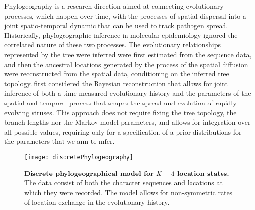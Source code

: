 Phylogeography is a research direction aimed at connecting evolutionary processes, which happen over time, with the processes of spatial dispersal into a joint spatio-temporal dynamic that can be used to track pathogen spread.
Historically, phylogeographic inference in molecular epidemiology ignored the correlated nature of these two processes. 
The evolutionary relationships represented by the tree were inferred were first estimated from the sequence data, and then the ancestral locations generated by the process of the spatial diffusion were reconstructed from the spatial data, conditioning on the inferred tree topology.
\citet{Lemey2009} first considered the Bayesian reconstruction that allows for joint inference of both a time-measured evolutionary history and the parameters of the spatial and temporal process that shapes the spread and evolution of 
rapidly evolving viruses.
This approach does not require fixing the tree topology, the branch lengths nor the Markov model parameters, and allows for integration over all possible values, requiring only for a specification of a prior distributions for the parameters that we aim to infer.


\begin{figure}[h!]
\centering
\texttt{[image: discretePhylogeography]} 
\caption{
{ \footnotesize 
{\bf Discrete phylogeographical model for $K=4$ location states.} 
The data consist of both the character sequences and locations at which they were recorded.
The model allows for non-symmetric rates of location exchange in the evolutionary history.
}%
}
\label{fig:discrete_phylo_illust}
\end{figure}


